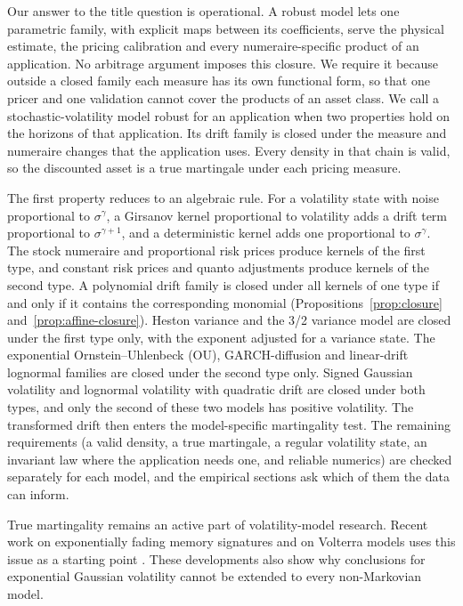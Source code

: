 \documentclass[11pt,a4paper]{article}
\theoremstyle{definition}
\theoremstyle{remark}
\begin{document}
Our answer to the title question is operational. A robust model lets one parametric family, with explicit maps between its coefficients, serve the physical estimate, the pricing calibration and every numeraire-specific product of an application. No arbitrage argument imposes this closure. We require it because outside a closed family each measure has its own functional form, so that one pricer and one validation cannot cover the products of an asset class.
We call a stochastic-volatility model robust for an application when two properties hold on the horizons of that application. Its drift family is closed under the measure and numeraire changes that the application uses. Every density in that chain is valid, so the discounted asset is a true martingale under each pricing measure.

The first property reduces to an algebraic rule. For a volatility state with noise proportional to $\sigma^\gamma$, a Girsanov kernel proportional to volatility adds a drift term proportional to $\sigma^{\gamma+1}$, and a deterministic kernel adds one proportional to $\sigma^\gamma$. The stock numeraire and proportional risk prices produce kernels of the first type, and constant risk prices and quanto adjustments produce kernels of the second type. A polynomial drift family is closed under all kernels of one type if and only if it contains the corresponding monomial (Propositions~\ref{prop:closure} and~\ref{prop:affine-closure}). Heston variance and the 3/2 variance model are closed under the first type only, with the exponent adjusted for a variance state. The exponential Ornstein--Uhlenbeck (OU), GARCH-diffusion and linear-drift lognormal families are closed under the second type only. Signed Gaussian volatility and lognormal volatility with quadratic drift are closed under both types, and only the second of these two models has positive volatility. The transformed drift then enters the model-specific martingality test. The remaining requirements (a valid density, a true martingale, a regular volatility state, an invariant law where the application needs one, and reliable numerics) are checked separately for each model, and the empirical sections ask which of them the data can inform.

True martingality remains an active part of volatility-model research. Recent work on exponentially fading memory signatures and on Volterra models uses this issue as a starting point \citep{SotnikovViot2026,GuyonJeanninJourdain2026}. These developments also show why conclusions for exponential Gaussian volatility cannot be extended to every non-Markovian model.
\end{document}
